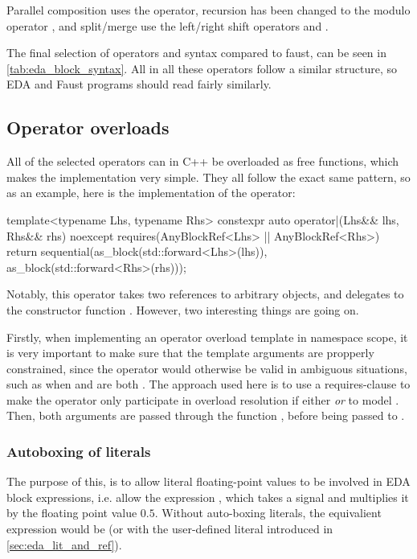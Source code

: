 Parallel composition uses the \oper{,} operator, recursion has been changed to the modulo
operator  \oper{\%}, and split/merge use the left/right shift operators \oper{<<}
and \oper{>>}.

The final selection of operators and syntax compared to faust, can be seen in \autoref{tab:eda_block_syntax}. All in
all these operators follow a similar structure, so EDA and Faust programs should read fairly similarly.

\subsection{Operator overloads}

All of the selected operators can in C++ be overloaded as free functions, which makes the implementation very
simple. They all follow the exact same pattern, so as an example, here is the implementation of the
\oper{|} operator:

\begin{cppcodenl}
  template<typename Lhs, typename Rhs>
  constexpr auto operator|(Lhs&& lhs, Rhs&& rhs) noexcept
  requires(AnyBlockRef<Lhs> || AnyBlockRef<Rhs>)
  {
    return sequential(as_block(std::forward<Lhs>(lhs)), as_block(std::forward<Rhs>(rhs)));
  }
\end{cppcodenl}

Notably, this operator takes two references to arbitrary objects, and delegates to the constructor function
. However, two interesting things are going on.

Firstly, when implementing an operator overload template in namespace scope, it is very important to make
sure that the template arguments are propperly constrained, since the operator would otherwise be valid in
ambiguous situations, such as when  and  are both . The approach
used here is to use a requires-clause to make the operator only participate in overload resolution if either
 \emph{or}  to model . Then, both arguments are passed through the
function
, before being passed to .

\subsubsection{Autoboxing of literals}

The purpose of this, is to allow literal floating-point values to be involved in EDA block expressions, i.e.
allow the expression , which takes a signal and multiplies it by the floating point
value $0.5$. Without auto-boxing literals, the equivalient expression would be
 (or  with the user-defined literal introduced in \autoref{sec:eda_lit_and_ref}).

